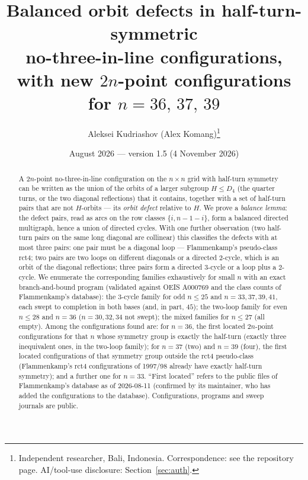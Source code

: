 \documentclass[11pt]{article}
\title{Balanced orbit defects in half-turn-symmetric\\ no-three-in-line configurations,\\
with new $2n$-point configurations for $n=36,\,37,\,39$}
\author{Aleksei Kudriashov (Alex Komang)\thanks{Independent researcher, Bali, Indonesia.  Correspondence: see the repository page.
AI/tool-use disclosure: Section~\ref{sec:auth}.}}
\date{August 2026 --- version 1.5 (4 November 2026)}
\theoremstyle{remark}
\newcommand{\Dfour}{D_4}
\begin{document}
\maketitle

\begin{abstract}
A $2n$-point no-three-in-line configuration on the $n\times n$ grid with half-turn symmetry can be written as the union
of the orbits of a larger subgroup $H\le\Dfour$ (the quarter turns, or the two diagonal reflections) that it contains,
together with a set of half-turn pairs that are not $H$-orbits --- its \emph{orbit defect} relative to $H$.  We prove a
\emph{balance lemma}: the defect pairs, read as arcs on the row classes $\{i,n-1-i\}$, form a balanced directed
multigraph, hence a union of directed cycles.  With one further observation (two half-turn pairs on the same long
diagonal are collinear) this classifies the defects with at most three pairs: one pair must be a diagonal loop ---
Flammenkamp's pseudo-class rct4; two pairs are two loops on different diagonals or a directed $2$-cycle, which is an
orbit of the diagonal reflections; three pairs form a directed $3$-cycle or a loop plus a $2$-cycle.  We enumerate the
corresponding families exhaustively for small $n$ with an exact branch-and-bound program (validated against OEIS A000769
and the class counts of Flammenkamp's database): the $3$-cycle family for odd $n\le25$ and $n=33,37,39,41$, each swept to completion in both bases (and, in part, $45$); the two-loop family for even $n\le28$ and $n=36$ ($n=30,32,34$ not swept); the mixed families for $n\le27$ (all empty).  Among the
configurations found are: for $n=36$, the first located $2n$-point configurations for that $n$ whose symmetry group is exactly the
half-turn (exactly three inequivalent ones, in the two-loop family); for $n=37$ (two) and $n=39$ (four), the first located configurations of that
symmetry group outside the rct4 pseudo-class (Flammenkamp's rct4 configurations of 1997/98 already have exactly
half-turn symmetry); and a further one for $n=33$.  ``First located'' refers to the public files of Flammenkamp's
database as of 2026-08-11 (confirmed by its maintainer, who has added the configurations to the database).  Configurations,
programs and sweep journals are public.
\end{abstract}
\end{document}
